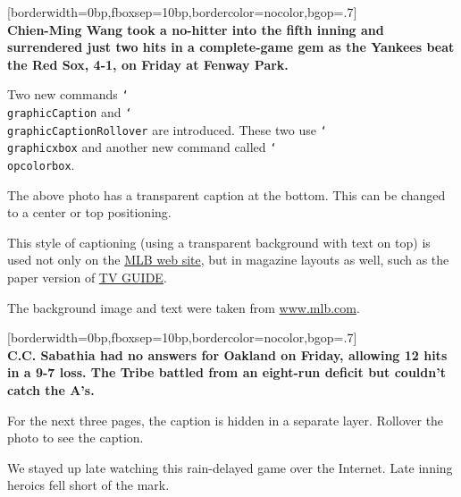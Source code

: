 \documentclass{article}
\newcommand{\cs}[1]{\texttt{\char`\\#1}}
\begin{document}
\maketitle

\begin{center}
[borderwidth=0bp,fboxsep=10bp,bordercolor=nocolor,bgop=.7]
    {\bfseries\makebox[\linewidth][c]{\textcolor{red}
    {Yankees fire first salvo in rivalry with two-hitter}}\\\relax\footnotesize
    Chien-Ming Wang took a no-hitter into the fifth inning and
    surrendered just two hits in a complete-game gem as the
    Yankees beat the Red Sox, 4-1, on Friday at Fenway Park.}%
\end{center}

Two new commands \cs{graphicCaption} and  \cs{graphicCaptionRollover} are introduced.
These two use \cs{graphicxbox} and another new command called \cs{opcolorbox}.

The above photo has a transparent caption at the bottom. This can be changed to
a center or top positioning.

This style of captioning (using a transparent background with text on top) is used not only
on the \href{http://www.mlb.com}{MLB web site}, but in magazine layouts as well, such as the
paper version of \href{http://www.tvguide.com}{TV GUIDE}.

The background image and text were taken from \href{http://www.mlb.com}{www.mlb.com}.

\def\myOpts{inclgraphicx={scale=.6},vcaption=b,hcaption=r,outerboxsep=0pt}

\begin{center}
\digiCap*[\myOpts,rollovername=YankeesRedSox]%
    {./digis/wobwRHNb}[borderwidth=0bp,fboxsep=10bp,bordercolor=nocolor,bgop=.7]
    {\parskip6pt\bfseries\makebox[\linewidth][c]{\textcolor{webblue}{Tribe rally
    falls short after Sabathia struggles}}\\\relax\footnotesize
    C.C. Sabathia had no answers for Oakland on Friday, allowing
    12 hits in a 9-7 loss. The Tribe battled from an eight-run
    deficit but couldn't catch the A's.}
\end{center}

For the next three pages, the caption is hidden in a separate layer. Rollover the photo
to see the caption.

We stayed up late watching this rain-delayed game over the Internet. Late inning
heroics fell short of the mark.
\end{document}
